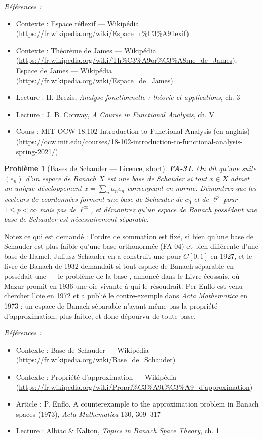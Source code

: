 \documentclass[11pt]{article}
\newtheorem{problem}{Problème}
\newenvironment{refs}{\par\small\noindent\emph{Références :}\begin{itemize}\setlength\itemsep{0pt}}{\end{itemize}\normalsize}
\begin{document}
\begin{refs}
\item Contexte : Espace réflexif --- Wikipédia (\url{https://fr.wikipedia.org/wiki/Espace_r%C3%A9flexif})
\item Contexte : Théorème de James --- Wikipédia (\url{https://fr.wikipedia.org/wiki/Th%C3%A9or%C3%A8me_de_James}), Espace de James --- Wikipédia (\url{https://fr.wikipedia.org/wiki/Espace_de_James})
\item Lecture : H. Brezis, \textit{Analyse fonctionnelle : théorie et applications}, ch. 3
\item Lecture : J. B. Conway, \textit{A Course in Functional Analysis}, ch. V
\item Cours : MIT OCW 18.102 Introduction to Functional Analysis (en anglais) (\url{https://ocw.mit.edu/courses/18-102-introduction-to-functional-analysis-spring-2021/})
\end{refs}

\bigskip

\begin{problem}[{Bases de Schauder --- Licence, short}]
\textbf{FA-31.} On dit qu'une suite $ (e_n) $ d'un espace de Banach $ X $ est
une \textit{base de Schauder} si tout $ x \in X $ admet un unique développement $ x = \sum_n a_n e_n $
convergeant en norme. Démontrez que les vecteurs de coordonnées forment une base de Schauder de
$ c_0 $ et de $ \ell^p $ pour $ 1 \le p < \infty $ mais pas de $ \ell^\infty $, et démontrez
qu'un espace de Banach possédant une base de Schauder est nécessairement séparable.
\end{problem}

\noindent Notez ce qui est demandé : l'ordre de sommation est fixé, si bien qu'une base de
Schauder est plus faible qu'une base orthonormée (FA-04) et bien différente d'une base de Hamel.
Juliusz Schauder en a construit une pour $ C[0,1] $ en 1927, et le livre de Banach de 1932 demandait
si tout espace de Banach séparable en possédait une --- le \og{} problème de la base \fg{}, annoncé dans le Livre
écossais, où Mazur promit en 1936 une oie vivante à qui le résoudrait. Per Enflo est venu chercher l'oie
en 1972 et a publié le contre-exemple dans \textit{Acta Mathematica} en 1973 : un espace de Banach séparable
n'ayant même pas la propriété d'approximation, plus faible, et donc dépourvu de toute base.

\begin{refs}
\item Contexte : Base de Schauder --- Wikipédia (\url{https://fr.wikipedia.org/wiki/Base_de_Schauder})
\item Contexte : Propriété d'approximation --- Wikipédia (\url{https://fr.wikipedia.org/wiki/Propri%C3%A9t%C3%A9_d'approximation})
\item Article : P. Enflo, \og{} A counterexample to the approximation problem in Banach spaces \fg{} (1973), \textit{Acta Mathematica} 130, 309--317
\item Lecture : Albiac \& Kalton, \textit{Topics in Banach Space Theory}, ch. 1
\end{refs}
\end{document}

